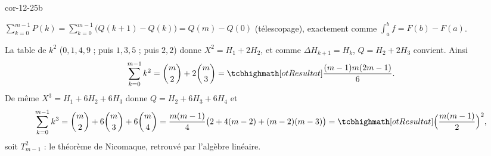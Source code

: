 \begin{blocLivre}{cor-12-25b}
\begin{corrigeSuite}
\begin{questions}[start=7]
  \item $\sum_{k=0}^{m-1}P(k)=\sum_{k=0}^{m-1}\bigl(Q(k+1)-Q(k)\bigr)=Q(m)-Q(0)$
    (télescopage), exactement comme $\int_a^bf=F(b)-F(a)$.
  \item La table de $k^{2}$ ($0,1,4,9$ ; puis $1,3,5$ ; puis $2,2$) donne
    $X^{2}=H_1+2H_2$, et comme $\Delta H_{k+1}=H_k$, $Q=H_2+2H_3$
    convient. Ainsi
    \[
    \sum_{k=0}^{m-1}k^{2}=\binom m2+2\binom m3=\res{\frac{(m-1)m(2m-1)}{6}} .
    \]
    De même $X^{3}=H_1+6H_2+6H_3$ donne $Q=H_2+6H_3+6H_4$ et
    \[
    \sum_{k=0}^{m-1}k^{3}=\binom m2+6\binom m3+6\binom m4
    =\frac{m(m-1)}{4}\bigl(2+4(m-2)+(m-2)(m-3)\bigr)
    =\res{\Bigl(\frac{m(m-1)}{2}\Bigr)^{2}} ,
    \]
    soit $T_{m-1}^{2}$ : le théorème de Nicomaque, retrouvé par l'algèbre
    linéaire.
\end{questions}
\end{corrigeSuite}
\end{blocLivre}
